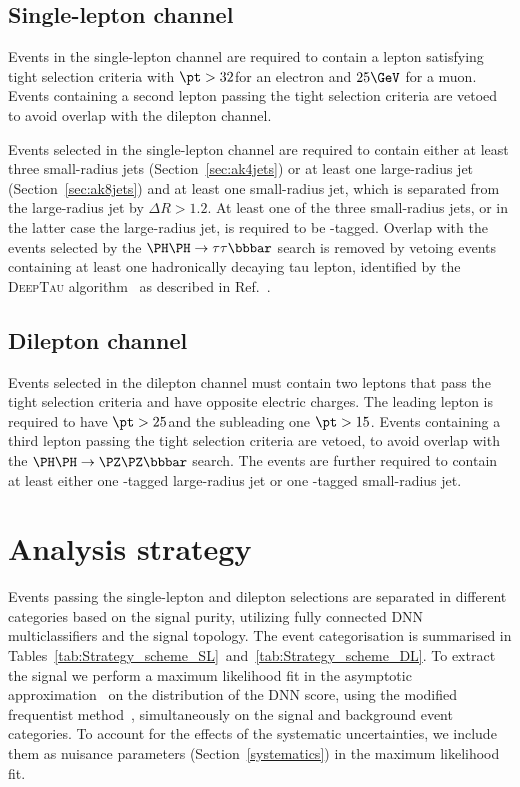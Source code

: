 \subsection{Single-lepton channel}
\label{sec:eventSelection_single_lepton}

Events in the single-lepton channel are required to contain a lepton satisfying tight selection criteria with $\pt > 32$\GeV for an electron and $25\GeV$ for a muon.
Events containing a second lepton passing the tight selection criteria are vetoed to avoid overlap with the dilepton channel.

Events selected in the single-lepton channel are required to contain either at least three small-radius jets (Section~\ref{sec:ak4jets}) or at least one large-radius jet (Section~\ref{sec:ak8jets}) and at least one small-radius jet, which is separated from the large-radius jet by $\Delta R > 1.2$. At least one of the three small-radius jets, or in the latter case the large-radius jet, is required to be \Pbottom-tagged.
Overlap with the events selected by the $\HH\to\bbtt$ search is removed by vetoing events containing at least one hadronically decaying tau lepton, identified by the \textsc{DeepTau} algorithm~\cite{CMS:2022prd} as described in Ref.~\cite{CMS:2022hgz}.

\subsection{Dilepton channel}
\label{sec:eventSelection_dilepton}

Events selected in the dilepton channel must contain two leptons that pass the tight selection criteria and have opposite electric charges.
The leading lepton is required to have $\pt > 25$\GeV and the subleading one $\pt > 15$\GeV.
Events containing a third lepton passing the tight selection criteria are vetoed, to avoid overlap with the $\HH\to\bbZZ$ search.
The events are further required to contain at least either one \Pbottom-tagged large-radius jet or one \Pbottom-tagged small-radius jet.
\section{Analysis strategy}
\label{DNN_categories}

Events passing the single-lepton and dilepton selections are separated in different categories based on the signal purity, utilizing fully connected DNN multiclassifiers and the \Hbb signal topology. The event categorisation is summarised in Tables~\ref{tab:Strategy_scheme_SL}~and~\ref{tab:Strategy_scheme_DL}.
To extract the \HH signal we perform a maximum likelihood fit in the asymptotic approximation~\cite{CMS-NOTE-2011-005} on the distribution of the DNN score, using the modified frequentist \CLs method~\cite{CLS1,CLS2}, simultaneously on the signal and background event categories.
To account for the effects of the systematic uncertainties, we include them as nuisance parameters (Section~\ref{systematics}) in the maximum likelihood fit.



